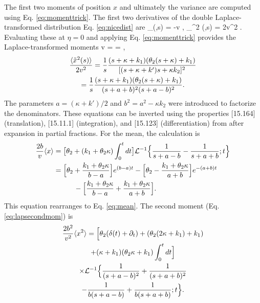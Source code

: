 The first two moments of position $x$ and ultimately the variance are computed using Eq. \ref{eq:momenttrick}. The first two derivatives of the double Laplace-transformed distribution Eq. \ref{eq:nicedist} are
\be \partial_\eta \tp(\eta,s) = -v ,\ee
\be \partial_\eta^2 \tp(\eta,s) = 2v^2  .\ee
Evaluating these at $\eta=0$ and applying Eq. \ref{eq:momenttrick} provides the Laplace-transformed moments
\be  {} {v} =  =  \label{eq:lapmean},\ee
\begin{multline} \frac{\langle \tilde{x}^2(s) \rangle}{2v^2} = \frac{1}{s} \frac{(s+\kappa+k_1)(\theta_2(s+\kappa)+k_1)}{[(s+\kappa+k')s+\kappa k_2]^2} \\=  \frac{1}{s}\frac{(s+\kappa+k_1)(\theta_2(s+\kappa)+k_1)}{(s+a+b)^2(s+a-b)^2}.\label{eq:lapsecondmom}\end{multline}
The parameters $a= (\kappa+k')/2$ and $b^2 = a^2 -\kappa k_2$ were introduced to factorize the denominators.
These equations can be inverted using the properties [15.164] (translation), [15.11.1] (integration), and [15.123] (differentiation) from  \citet{Arfken1985} after expansion in partial fractions.
For the mean, the calculation is
\begin{align}
\begin{split}
	\frac{2b}{v}\langle x \rangle &= \big[\theta_2 + (k_1+\theta_2 \kappa)\int_0^t dt\big]\mathcal{L}^{-1}\Big\{ \frac{1}{s+a-b}-\frac{1}{s+a+b};t\Big\}\\
	&= \Big[\theta_2 + \frac{k_1+\theta_2\kappa}{b-a}\Big]e^{(b-a)t} - \Big[\theta_2 - \frac{k_1+\theta_2\kappa}{a+b}\Big]e^{-(a+b)t} \\
 & \hspace{1cm}- \Big[\frac{k_1+\theta_2\kappa}{b-a} + \frac{k_1+\theta_2\kappa}{a+b}\Big].
\end{split}
\end{align}
This equation rearranges to Eq. \ref{eq:mean}.
The second moment (Eq. \ref{eq:lapsecondmom}) is 
\begin{multline}
	\frac{2b^2}{v^2}\langle x^2 \rangle = \Big[\theta_2(\delta(t) + \partial_t) + (\theta_2(2\kappa + k_1)+k_1) \\ + (\kappa+k_1)(\theta_2\kappa+k_1)\int_0^t dt \Big] \\
	\times \mathcal{L}^{-1}\Big\{ \frac{1}{(s+a-b)^2} + \frac{1}{(s+a+b)^2} \\-\frac{1}{b(s+a-b)}+\frac{1}{b(s+a+b)};t\Big\}.
\end{multline}
